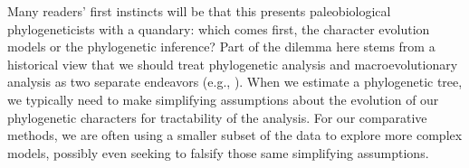 \documentclass{article}
\begin{document}
Many readers’ first instincts will be that this presents paleobiological phylogeneticists with a quandary: which comes first, the character evolution models or the phylogenetic inference?  
Part of the dilemma here stems from a historical view that we should treat phylogenetic analysis and macroevolutionary analysis as two separate endeavors (e.g., \cite{Harvey1991}).  
When we estimate a phylogenetic tree, we typically need to make simplifying assumptions about the evolution of our phylogenetic characters for tractability of the analysis.
For our comparative methods, we are often using a smaller subset of the data to explore more complex models, possibly even seeking to falsify those same simplifying assumptions.
\end{document}
